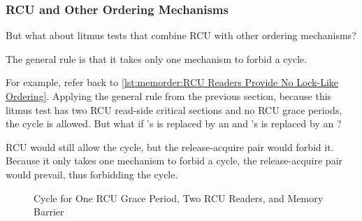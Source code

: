 \subsubsection{RCU and Other Ordering Mechanisms}
\label{sec:memorder:RCU and Other Ordering Mechanisms}

But what about litmus tests that combine RCU with other ordering
mechanisms?

The general rule is that it takes only one mechanism to forbid a cycle.

For example, refer back to
\cref{lst:memorder:RCU Readers Provide No Lock-Like Ordering}.
Applying the general rule from the previous section, because this litmus
test has two RCU read-side critical sections and no RCU grace periods,
the cycle is allowed.
But what if 's  is replaced by an
 and 's  is replaced
by an ?

RCU would still allow the cycle, but the release-acquire pair would
forbid it.
Because it only takes one mechanism to forbid a cycle, the release-acquire
pair would prevail, thus forbidding the cycle.

\begin{figure}
\centering
{}
\caption{Cycle for One RCU Grace Period, Two RCU Readers, and Memory Barrier}
\label{fig:memorder:Cycle for One RCU Grace Period; Two RCU Readers; and Memory Barrier}
\end{figure}

